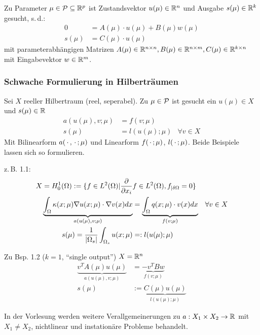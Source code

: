 \begin{bsp}
Zu Parameter $\mu \in \mathcal{P} \subseteq \mathbb{R}^p$ ist Zustandsvektor $u(\mu) \in \mathbb{R}^n$ und Ausgabe $s(\mu) \in \mathbb{R}^k$ gesucht, s.\,d.:
\begin{align*}
	0 &= A(\mu) \cdot u(\mu) + B(\mu) w(\mu) \\
	s(\mu) &= C(\mu) \cdot u(\mu)
\end{align*} 
mit parameterabhängigen Matrizen $A(\mu) \in \mathbb{R}^{n\times n}, B(\mu) \in \mathbb{R}^{n\times m}, C(\mu) \in \mathbb{R}^{k \times n}$ mit Eingabevektor $w \in \mathbb{R}^m$.
\end{bsp}

\subsubsection*{Schwache Formulierung in Hilberträumen}
\label{Schwache Formulierung in Hilberträumen}

Sei $X$ reeller Hilbertraum (reel, seperabel). Zu $\mu \in \mathcal{P}$ ist gesucht ein $u(\mu) \in X$ und $s(\mu) \in \mathbb{R}$
\begin{align*}
	a(u(\mu),v; \mu) &= f(v; \mu) \\
	s(\mu) &= l(u(\mu); \mu) & \forall v \in X
\end{align*}
Mit Bilinearform $a(\,\cdot\,,\,\cdot\,; \mu)$ und Linearform $f(\,\cdot\,; \mu)$, $l(\,\cdot\,; \mu)$. Beide Beispiele lassen sich so formulieren.

z.\,B. 1.1: 
\begin{align*}
	X=H_0^1(\Omega):=\{f\in L^2(\Omega) | \frac{\partial}{\partial {x_i}}& f \in L^2(\Omega), f_{|\delta\Omega} = 0\} \\
	\underbrace{\int_{\Omega} \kappa (x; \mu) \nabla u(x; \mu) \cdot \nabla v(x) dx}_{a(u(\mu),v; \mu)} &= \underbrace{\int_{\Omega} q(x; \mu) \cdot v(x) dx}_{f(v; \mu)} &\forall v \in X \\
	s(\mu) = \frac{1}{|\Omega_s|} \int_{\Omega_s} u(x; \mu) &=: l(u(\mu); \mu)
\end{align*}

Zu Bsp. 1.2 ($k=1$, "`single output"') \qquad $X = \mathbb{R}^n$
\begin{align*}
	\underbrace{v^TA(\mu)u(\mu)}_{a(u(\mu),v; \mu)} &= \underbrace{-v^TBw}_{f(v; \mu)} \\
	s(\mu) &:= \underbrace{C(\mu)u(\mu)}_{l(u(\mu); \mu)}
\end{align*}

In der Vorlesung werden weitere Verallgemeinerungen zu $a:X_1 \times X_2 \rightarrow \mathbb{R}$ mit $X_1 \neq X_2$, nichtlinear und instationäre Probleme behandelt.

